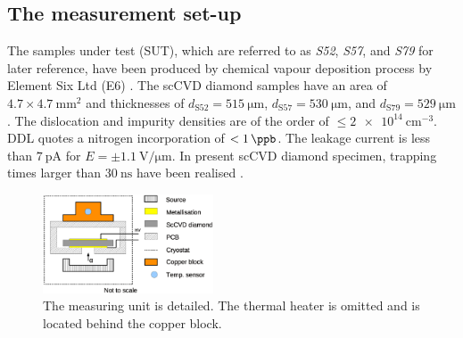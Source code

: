 \subsection{The measurement set-up}
The samples under test (SUT), which are referred to as \textit{S52}, \textit{S57}, and \textit{S79} for later reference, have been produced by chemical vapour deposition process
 by Element Six Ltd (E6) \cite{E6}.
The scCVD diamond samples have an area of $4.7 \times \SI{4.7}{\milli\meter^2}$
 and thicknesses of $d_{\textrm{S52}} = \SI{515}{\micro\meter}$, $d_{\textrm{S57}} = \SI{530}{\micro\meter}$, and $d_{\textrm{S79}} = \SI{529}{\micro\meter}$.
The dislocation and impurity densities are of the order of $\le \SI{2e14}{\centi\meter^{-3}}$. 
DDL quotes a nitrogen incorporation of $<\SI{1}{\ppb}$.
The leakage current is less than $\SI{7}{\pico\ampere}$ for $E = \pm \SI{1.1}{\volt/\micro\meter}$. 
In present scCVD diamond specimen, trapping times larger than $\SI{30}{\nano\second}$ have been realised \cite{pernegger:073704}. 

\begin{figure}[tb]
  \centering
  \includegraphics[trim=0cm 1.5cm 0cm 0.5cm, clip=true,width=0.45\textwidth]{./figures/diamond_collimator4.eps}

  \caption{The measuring unit is detailed. The thermal heater is omitted and is located behind the copper block.}
  \label{fig:SETUPtct}
\end{figure} %

